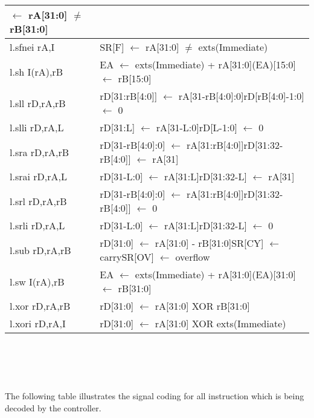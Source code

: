 \begin{longtable}{|p{3cm}|p{10cm}|}
$\leftarrow$ rA[31:0] $\ne$ rB[31:0] \\ \hline l.sfnei rA,I & SR[F] $\leftarrow$ rA[31:0] $\ne$ exts(Immediate) \\ \hline l.sh I(rA),rB & EA $\leftarrow$ exts(Immediate) + rA[31:0]\newline (EA)[15:0] $\leftarrow$ rB[15:0] \\ \hline l.sll rD,rA,rB & rD[31:rB[4:0]] $\leftarrow$ rA[31-rB[4:0]:0]\newline rD[rB[4:0]-1:0] $\leftarrow$ 0 \\ \hline l.slli rD,rA,L & rD[31:L] $\leftarrow$ rA[31-L:0]\newline rD[L-1:0] $\leftarrow$ 0 \\ \hline l.sra rD,rA,rB & rD[31-rB[4:0]:0] $\leftarrow$ rA[31:rB[4:0]]\newline rD[31:32-rB[4:0]] $\leftarrow$ rA[31] \\ \hline l.srai rD,rA,L & rD[31-L:0] $\leftarrow$ rA[31:L]\newline rD[31:32-L] $\leftarrow$ rA[31] \\ \hline l.srl rD,rA,rB & rD[31-rB[4:0]:0] $\leftarrow$ rA[31:rB[4:0]]\newline rD[31:32-rB[4:0]] $\leftarrow$ 0 \\ \hline l.srli rD,rA,L & rD[31-L:0] $\leftarrow$ rA[31:L]\newline rD[31:32-L] $\leftarrow$ 0 \\ \hline l.sub rD,rA,rB & rD[31:0] $\leftarrow$ rA[31:0] - rB[31:0]\newline SR[CY] $\leftarrow$ carry\newline SR[OV] $\leftarrow$ overflow \\ \hline l.sw I(rA),rB & EA $\leftarrow$ exts(Immediate) + rA[31:0]\newline (EA)[31:0] $\leftarrow$ rB[31:0] \\ \hline l.xor rD,rA,rB & rD[31:0] $\leftarrow$ rA[31:0] XOR rB[31:0] \\ \hline l.xori rD,rA,I & rD[31:0] $\leftarrow$ rA[31:0] XOR exts(Immediate)\\ \hline


\end{longtable}
\ \\ \\ \\ \\
The following table illustrates the signal coding for all instruction which is being decoded by the controller.

\begin{landscape}
\addtocounter{table}{1}

\end{landscape}


















